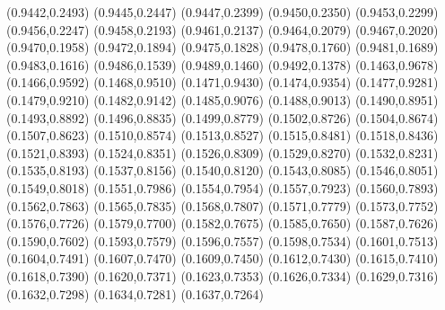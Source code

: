 \PST@Cross(0.9442,0.2493)
\PST@Cross(0.9445,0.2447)
\PST@Cross(0.9447,0.2399)
\PST@Cross(0.9450,0.2350)
\PST@Cross(0.9453,0.2299)
\PST@Cross(0.9456,0.2247)
\PST@Cross(0.9458,0.2193)
\PST@Cross(0.9461,0.2137)
\PST@Cross(0.9464,0.2079)
\PST@Cross(0.9467,0.2020)
\PST@Cross(0.9470,0.1958)
\PST@Cross(0.9472,0.1894)
\PST@Cross(0.9475,0.1828)
\PST@Cross(0.9478,0.1760)
\PST@Cross(0.9481,0.1689)
\PST@Cross(0.9483,0.1616)
\PST@Cross(0.9486,0.1539)
\PST@Cross(0.9489,0.1460)
\PST@Cross(0.9492,0.1378)
\PST@Filltriangle(0.1463,0.9678)
\PST@Filltriangle(0.1466,0.9592)
\PST@Filltriangle(0.1468,0.9510)
\PST@Filltriangle(0.1471,0.9430)
\PST@Filltriangle(0.1474,0.9354)
\PST@Filltriangle(0.1477,0.9281)
\PST@Filltriangle(0.1479,0.9210)
\PST@Filltriangle(0.1482,0.9142)
\PST@Filltriangle(0.1485,0.9076)
\PST@Filltriangle(0.1488,0.9013)
\PST@Filltriangle(0.1490,0.8951)
\PST@Filltriangle(0.1493,0.8892)
\PST@Filltriangle(0.1496,0.8835)
\PST@Filltriangle(0.1499,0.8779)
\PST@Filltriangle(0.1502,0.8726)
\PST@Filltriangle(0.1504,0.8674)
\PST@Filltriangle(0.1507,0.8623)
\PST@Filltriangle(0.1510,0.8574)
\PST@Filltriangle(0.1513,0.8527)
\PST@Filltriangle(0.1515,0.8481)
\PST@Filltriangle(0.1518,0.8436)
\PST@Filltriangle(0.1521,0.8393)
\PST@Filltriangle(0.1524,0.8351)
\PST@Filltriangle(0.1526,0.8309)
\PST@Filltriangle(0.1529,0.8270)
\PST@Filltriangle(0.1532,0.8231)
\PST@Filltriangle(0.1535,0.8193)
\PST@Filltriangle(0.1537,0.8156)
\PST@Filltriangle(0.1540,0.8120)
\PST@Filltriangle(0.1543,0.8085)
\PST@Filltriangle(0.1546,0.8051)
\PST@Filltriangle(0.1549,0.8018)
\PST@Filltriangle(0.1551,0.7986)
\PST@Filltriangle(0.1554,0.7954)
\PST@Filltriangle(0.1557,0.7923)
\PST@Filltriangle(0.1560,0.7893)
\PST@Filltriangle(0.1562,0.7863)
\PST@Filltriangle(0.1565,0.7835)
\PST@Filltriangle(0.1568,0.7807)
\PST@Filltriangle(0.1571,0.7779)
\PST@Filltriangle(0.1573,0.7752)
\PST@Filltriangle(0.1576,0.7726)
\PST@Filltriangle(0.1579,0.7700)
\PST@Filltriangle(0.1582,0.7675)
\PST@Filltriangle(0.1585,0.7650)
\PST@Filltriangle(0.1587,0.7626)
\PST@Filltriangle(0.1590,0.7602)
\PST@Filltriangle(0.1593,0.7579)
\PST@Filltriangle(0.1596,0.7557)
\PST@Filltriangle(0.1598,0.7534)
\PST@Filltriangle(0.1601,0.7513)
\PST@Filltriangle(0.1604,0.7491)
\PST@Filltriangle(0.1607,0.7470)
\PST@Filltriangle(0.1609,0.7450)
\PST@Filltriangle(0.1612,0.7430)
\PST@Filltriangle(0.1615,0.7410)
\PST@Filltriangle(0.1618,0.7390)
\PST@Filltriangle(0.1620,0.7371)
\PST@Filltriangle(0.1623,0.7353)
\PST@Filltriangle(0.1626,0.7334)
\PST@Filltriangle(0.1629,0.7316)
\PST@Filltriangle(0.1632,0.7298)
\PST@Filltriangle(0.1634,0.7281)
\PST@Filltriangle(0.1637,0.7264)
